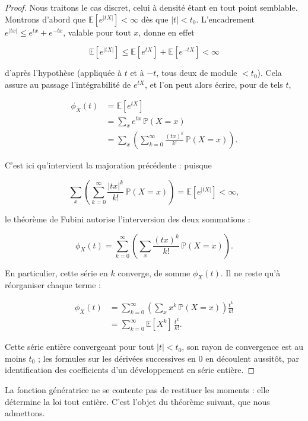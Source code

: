 \begin{proof}
Nous traitons le cas discret, celui à densité étant en tout point semblable. Montrons d'abord que $\mathbb{E}[e^{|tX|}] < \infty$ dès que $|t| < t_0$. L'encadrement $e^{|tx|} \leq e^{tx} + e^{-tx}$, valable pour tout $x$, donne en effet

$$
\mathbb{E}[e^{|tX|}] \leq \mathbb{E}[e^{tX}] + \mathbb{E}[e^{-tX}] < \infty
$$

d'après l'hypothèse (appliquée à $t$ et à $-t$, tous deux de module $< t_0$). Cela assure au passage l'intégrabilité de $e^{tX}$, et l'on peut alors écrire, pour de tels $t$,

\begin{align*}
\phi_X(t) &= \mathbb{E}[e^{tX}] \\
&= \sum_x e^{tx}\, \mathbb{P}(X = x) \\
&= \sum_x \left( \sum_{k=0}^\infty \frac{(tx)^k}{k!}\, \mathbb{P}(X = x) \right).
\end{align*}

C'est ici qu'intervient la majoration précédente : puisque

$$
\sum_x \left( \sum_{k=0}^\infty \frac{|tx|^k}{k!}\, \mathbb{P}(X = x) \right) = \mathbb{E}[e^{|tX|}] < \infty,
$$

le théorème de Fubini autorise l'interversion des deux sommations :

$$
\phi_X(t) = \sum_{k=0}^\infty \left( \sum_x \frac{(tx)^k}{k!}\, \mathbb{P}(X = x) \right).
$$

En particulier, cette série en $k$ converge, de somme $\phi_X(t)$. Il ne reste qu'à réorganiser chaque terme :

\begin{align*}
\phi_X(t) &= \sum_{k=0}^\infty \left( \sum_x x^k\, \mathbb{P}(X = x) \right) \frac{t^k}{k!} \\
&= \sum_{k=0}^\infty \mathbb{E}[X^k]\, \frac{t^k}{k!}.
\end{align*}

Cette série entière convergeant pour tout $|t| < t_0$, son rayon de convergence est au moins $t_0$ ; les formules sur les dérivées successives en $0$ en découlent aussitôt, par identification des coefficients d'un développement en série entière.
\end{proof}

La fonction génératrice ne se contente pas de restituer les moments : elle détermine la loi tout entière. C'est l'objet du théorème suivant, que nous admettons.

\medskip

